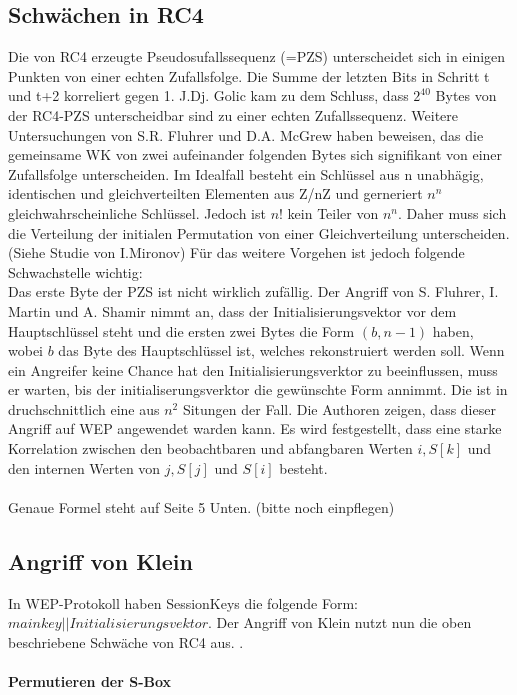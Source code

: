 \documentclass[10pt,a4paper]{article}
\begin{document}
\subsection{Schwächen in RC4}
Die von RC4 erzeugte Pseudosufallssequenz (=PZS) unterscheidet sich in einigen Punkten von einer echten Zufallsfolge. Die Summe der letzten Bits in Schritt t und t+2 korreliert gegen 1.
J.Dj. Golic kam zu dem Schluss, dass $2^40$ Bytes von der RC4-PZS unterscheidbar sind zu einer echten Zufallssequenz.
Weitere Untersuchungen von S.R. Fluhrer und D.A. McGrew haben beweisen, das die gemeinsame WK von zwei aufeinander folgenden Bytes sich signifikant von einer Zufallsfolge unterscheiden. Im Idealfall besteht ein Schlüssel aus n unabhägig, identischen und gleichverteilten Elementen aus Z/nZ und gerneriert $n^n$ gleichwahrscheinliche Schlüssel. Jedoch ist $n!$ kein Teiler von $n^n$. Daher muss sich die Verteilung der initialen Permutation von einer Gleichverteilung unterscheiden. (Siehe Studie von I.Mironov)
Für das weitere Vorgehen ist jedoch folgende Schwachstelle wichtig:\\
Das erste Byte der PZS ist nicht wirklich zufällig. Der Angriff von S. Fluhrer, I. Martin und A. Shamir nimmt an, dass der Initialisierungsvektor vor dem Hauptschlüssel steht und die ersten zwei Bytes die Form $(b,n-1)$ haben, wobei $b$ das Byte des Hauptschlüssel ist, welches rekonstruiert werden soll. Wenn ein Angreifer keine Chance hat den Initialisierungsverktor zu beeinflussen, muss er warten, bis der initialiserungsverktor die gewünschte Form annimmt. Die ist in druchschnittlich eine aus $n^2$ Situngen der Fall. Die Authoren zeigen, dass dieser Angriff auf WEP angewendet warden kann.
Es wird festgestellt, dass eine starke Korrelation zwischen den beobachtbaren und abfangbaren Werten $i, S[k]$ und den internen Werten von $j, S[j]$ und $S[i]$ besteht.
\\\\
Genaue Formel steht auf Seite 5 Unten. (bitte noch einpflegen)

\subsection{Angriff von Klein}
In WEP-Protokoll haben SessionKeys die folgende Form: $main key || Initialisierungsvektor$. Der Angriff von Klein nutzt nun die oben beschriebene Schwäche von RC4 aus. 
. 
\paragraph{Permutieren der S-Box} %
\end{document}
